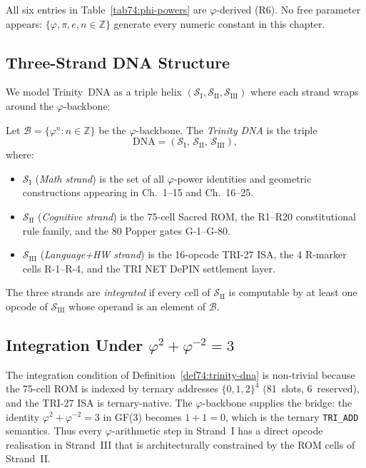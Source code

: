 \begin{remark}
All six entries in Table~\ref{tab74:phi-powers} are $\varphi$-derived
(R6). No free parameter appears: $\{\varphi,\pi,e,n\in\mathbb{Z}\}$
generate every numeric constant in this chapter.
\end{remark}

\subsection{Three-Strand DNA Structure}
\label{sec74:dna-structure}

We model Trinity~DNA as a triple helix $(\mathcal{S}_{\mathrm{I}},
\mathcal{S}_{\mathrm{II}}, \mathcal{S}_{\mathrm{III}})$ where each
strand wraps around the $\varphi$-backbone:

\begin{definition}
\label{def74:trinity-dna}
Let $\mathcal{B} = \{\varphi^{n} : n \in \mathbb{Z}\}$ be the
$\varphi$-backbone.  The \emph{Trinity DNA} is the triple
\[
  \mathrm{DNA} = (\mathcal{S}_{\mathrm{I}},\,
                  \mathcal{S}_{\mathrm{II}},\,
                  \mathcal{S}_{\mathrm{III}}),
\]
where:
\begin{itemize}
  \item $\mathcal{S}_{\mathrm{I}}$ (\emph{Math strand}) is the set of
    all $\varphi$-power identities and geometric constructions appearing
    in Ch.~1--15 and Ch.~16--25.
  \item $\mathcal{S}_{\mathrm{II}}$ (\emph{Cognitive strand}) is the
    75-cell Sacred ROM, the R1--R20 constitutional rule family, and the
    80 Popper gates G-1--G-80.
  \item $\mathcal{S}_{\mathrm{III}}$ (\emph{Language+HW strand}) is the
    16-opcode TRI-27 ISA, the 4 R-marker cells R-1--R-4, and the TRI NET
    DePIN settlement layer.
\end{itemize}
The three strands are \emph{integrated} if every cell of
$\mathcal{S}_{\mathrm{II}}$ is computable by at least one opcode of
$\mathcal{S}_{\mathrm{III}}$ whose operand is an element of $\mathcal{B}$.
\end{definition}

\subsection{Integration Under $\varphi^{2}+\varphi^{-2}=3$}
\label{sec74:integration}

The integration condition of Definition~\ref{def74:trinity-dna} is
non-trivial because the 75-cell ROM is indexed by ternary addresses
$\{0,1,2\}^{4}$ (81~slots, 6~reserved), and the TRI-27 ISA is
ternary-native.  The $\varphi$-backbone supplies the bridge: the
identity $\varphi^{2}+\varphi^{-2}=3$ in GF(3) becomes
$1 + 1 = 0$, which is the ternary \texttt{TRI\_ADD} semantics.  Thus
every $\varphi$-arithmetic step in Strand~I has a direct opcode
realisation in Strand~III that is architecturally constrained by the
ROM cells of Strand~II.

